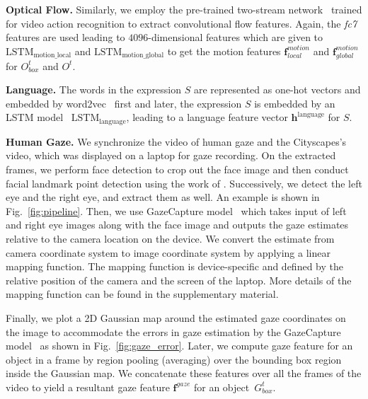 \documentclass[10pt,twocolumn,letterpaper]{article}
\newcommand{\model}[2]{$\text{#1}_{\text{#2}}$}
\newcommand{\vect}[1]{{\mathbf #1}}
\begin{document}
\noindent \textbf{Optical Flow.}
Similarly, we employ the pre-trained two-stream network~\cite{two:stream:nips14} trained for video action recognition to extract convolutional flow features. Again, the \emph{fc7} features are used leading to $4096$-dimensional features which are given to \model{LSTM}{motion\_local} and \model{LSTM}{motion\_global} to get the motion features $\vect{f}_{local}^{motion}$ and $\vect{f}_{global}^{motion}$ for $O_{box}^t$ and $O^t$. 

\noindent \textbf{Language.} 
The words in the expression $S$  are represented as one-hot vectors and embedded by word2vec~\cite{glove} first and later, the expression $S$ is embedded by an LSTM model~\cite{lstm} \model{LSTM}{language}, leading to a language feature vector $\vect{h}^{\text{language}}$ for $S$.  

\noindent \textbf{Human Gaze.}
We synchronize the video of human gaze and the Cityscapes's video, which was displayed on a laptop for gaze recording. On the extracted frames, we perform face detection to crop out the face image and then conduct facial landmark point detection using the work of \cite{kowalski2017deep}. Successively, we detect the left eye and the right eye, and extract them as well. An example is shown in Fig.~\ref{fig:pipeline}. Then, we use GazeCapture model~\cite{krafka2016eye} which takes input of left and right eye images along with the face image and outputs the gaze estimates relative to the camera location on the device. We convert the estimate from camera coordinate system to image coordinate system by applying a linear mapping function. The mapping function is device-specific and defined by the relative position of the camera and the screen of the laptop. More details of the mapping function can be found in the supplementary material. 

Finally, we plot a 2D Gaussian map around the estimated gaze coordinates on the image to accommodate the errors in gaze estimation by the GazeCapture model~\cite{krafka2016eye} as shown in Fig.~\ref{fig:gaze_error}. Later, we compute gaze feature for an object in a frame by region pooling (averaging) over the bounding box region inside the Gaussian map. We concatenate these features over all the frames of the video to yield a resultant gaze feature $\vect{f}^{gaze}$ for an object~\ie $G_{box}^t$.
\end{document}
